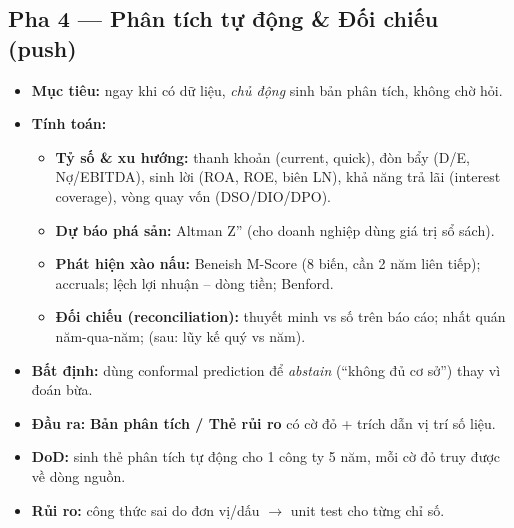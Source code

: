 \documentclass[11pt,a4paper]{article}
\newcommand{\pha}[1]{\subsection{#1}}
\begin{document}
\pha{Pha 4 --- Phân tích tự động \& Đối chiếu (push)}
\begin{itemize}
  \item \textbf{Mục tiêu:} ngay khi có dữ liệu, \emph{chủ động} sinh bản phân tích, không chờ hỏi.
  \item \textbf{Tính toán:}
  \begin{itemize}
    \item \textbf{Tỷ số \& xu hướng:} thanh khoản (current, quick), đòn bẩy (D/E, Nợ/EBITDA), sinh lời (ROA, ROE, biên LN), khả năng trả lãi (interest coverage), vòng quay vốn (DSO/DIO/DPO).
    \item \textbf{Dự báo phá sản:} Altman Z'' (cho doanh nghiệp dùng giá trị sổ sách).
    \item \textbf{Phát hiện xào nấu:} Beneish M-Score (8 biến, cần 2 năm liên tiếp); accruals; lệch lợi nhuận -- dòng tiền; Benford.
    \item \textbf{Đối chiếu (reconciliation):} thuyết minh vs số trên báo cáo; nhất quán năm-qua-năm; (sau: lũy kế quý vs năm).
  \end{itemize}
  \item \textbf{Bất định:} dùng conformal prediction để \emph{abstain} (``không đủ cơ sở'') thay vì đoán bừa.
  \item \textbf{Đầu ra:} \textbf{Bản phân tích / Thẻ rủi ro} có cờ đỏ + trích dẫn vị trí số liệu.
  \item \textbf{DoD:} sinh thẻ phân tích tự động cho 1 công ty 5 năm, mỗi cờ đỏ truy được về dòng nguồn.
  \item \textbf{Rủi ro:} công thức sai do đơn vị/dấu $\rightarrow$ unit test cho từng chỉ số.
\end{itemize}
\end{document}
